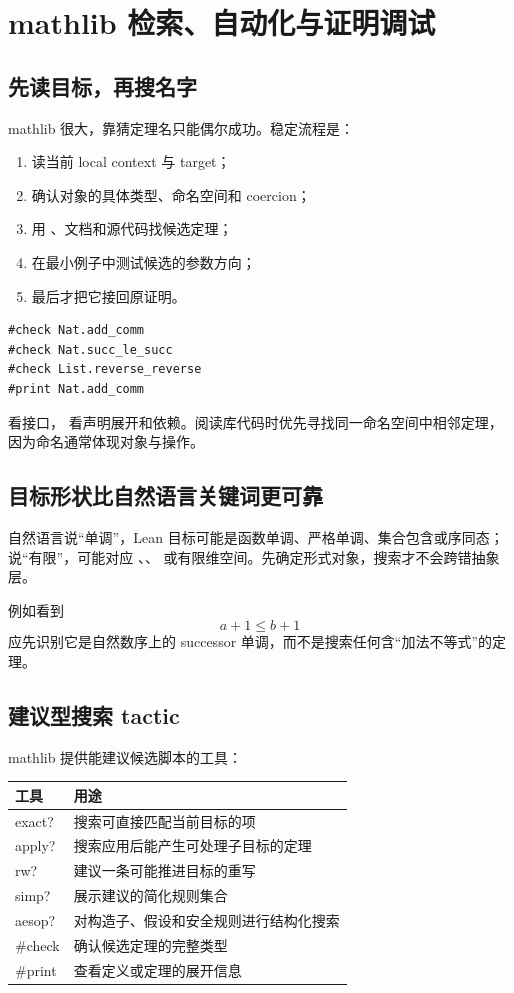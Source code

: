\chapter{mathlib 检索、自动化与证明调试}

\section{先读目标，再搜名字}

mathlib 很大，靠猜定理名只能偶尔成功。稳定流程是：
\begin{enumerate}
  \item 读当前 local context 与 target；
  \item 确认对象的具体类型、命名空间和 coercion；
  \item 用 、文档和源代码找候选定理；
  \item 在最小例子中测试候选的参数方向；
  \item 最后才把它接回原证明。
\end{enumerate}

\begin{lstlisting}
#check Nat.add_comm
#check Nat.succ_le_succ
#check List.reverse_reverse
#print Nat.add_comm
\end{lstlisting}
 看接口， 看声明展开和依赖。阅读库代码时优先寻找同一命名空间中相邻定理，因为命名通常体现对象与操作。

\section{目标形状比自然语言关键词更可靠}

自然语言说“单调”，Lean 目标可能是函数单调、严格单调、集合包含或序同态；说“有限”，可能对应 、、 或有限维空间。先确定形式对象，搜索才不会跨错抽象层。

例如看到
\[
a+1\le b+1
\]
应先识别它是自然数序上的 successor 单调，而不是搜索任何含“加法不等式”的定理。

\section{建议型搜索 tactic}

mathlib 提供能建议候选脚本的工具：
\begin{center}
\begin{tabularx}{0.94\textwidth}{>{\ttfamily}lX}
\toprule
\normalfont 工具 & 用途 \\
\midrule
exact? & 搜索可直接匹配当前目标的项 \\
apply? & 搜索应用后能产生可处理子目标的定理 \\
rw? & 建议一条可能推进目标的重写 \\
simp? & 展示建议的简化规则集合 \\
aesop? & 对构造子、假设和安全规则进行结构化搜索 \\
\#check & 确认候选定理的完整类型 \\
\#print & 查看定义或定理的展开信息 \\
\bottomrule
\end{tabularx}
\end{center}


